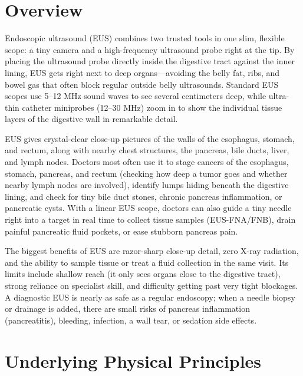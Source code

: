 \label{ch:infographic-eus}

\section{Overview}

Endoscopic ultrasound (EUS) combines two trusted tools in one slim, flexible scope: a tiny camera and a high-frequency ultrasound probe right at the tip. By placing the ultrasound probe directly inside the digestive tract against the inner lining, EUS gets right next to deep organs---avoiding the belly fat, ribs, and bowel gas that often block regular outside belly ultrasounds. Standard EUS scopes use 5--12 MHz sound waves to see several centimeters deep, while ultra-thin catheter miniprobes (12--30 MHz) zoom in to show the individual tissue layers of the digestive wall in remarkable detail.

EUS gives crystal-clear close-up pictures of the walls of the esophagus, stomach, and rectum, along with nearby chest structures, the pancreas, bile ducts, liver, and lymph nodes. Doctors most often use it to stage cancers of the esophagus, stomach, pancreas, and rectum (checking how deep a tumor goes and whether nearby lymph nodes are involved), identify lumps hiding beneath the digestive lining, and check for tiny bile duct stones, chronic pancreas inflammation, or pancreatic cysts. With a linear EUS scope, doctors can also guide a tiny needle right into a target in real time to collect tissue samples (EUS-FNA/FNB), drain painful pancreatic fluid pockets, or ease stubborn pancreas pain.

The biggest benefits of EUS are razor-sharp close-up detail, zero X-ray radiation, and the ability to sample tissue or treat a fluid collection in the same visit. Its limits include shallow reach (it only sees organs close to the digestive tract), strong reliance on specialist skill, and difficulty getting past very tight blockages. A diagnostic EUS is nearly as safe as a regular endoscopy; when a needle biopsy or drainage is added, there are small risks of pancreas inflammation (pancreatitis), bleeding, infection, a wall tear, or sedation side effects.

\section{Underlying Physical Principles}

